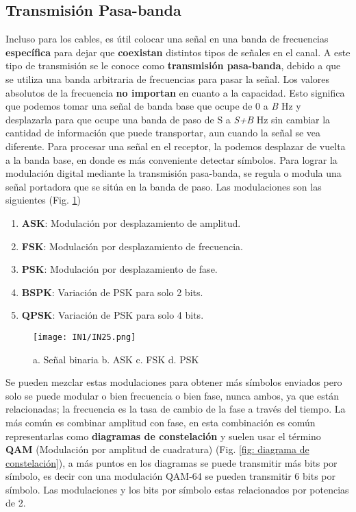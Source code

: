 \documentclass[
	12pt, %
	fleqn, %
	a4paper, %
]{LegrandOrangeBook}
\begin{document}
\subsection{Transmisión Pasa-banda}
Incluso para los cables, es útil colocar una señal en una banda de frecuencias \textbf{específica} para dejar que \textbf{coexistan} distintos tipos de señales en el canal. A este tipo de transmisión se le conoce como \textbf{transmisión pasa-banda}, debido a que se utiliza una banda arbitraria de frecuencias para pasar la señal. Los valores absolutos de la frecuencia \textbf{no importan} en cuanto a la capacidad. Esto significa que podemos tomar una señal de banda base que ocupe de 0 a \textit{B} Hz y desplazarla para que ocupe una banda de paso de S a \textit{S+B} Hz sin cambiar la cantidad de información que puede transportar, aun cuando la señal se vea diferente. Para procesar una señal en el receptor, la podemos desplazar de vuelta a la banda base, en donde es más conveniente detectar símbolos. Para lograr la modulación digital mediante la transmisión pasa-banda, se regula o modula una señal portadora que se sitúa en la banda de paso.	Las modulaciones son las siguientes (Fig. \ref{fig: modulacion ancho B})
\begin{enumerate}
\item \textbf{ASK}: Modulación por desplazamiento de amplitud.
\item \textbf{FSK}: Modulación por desplazamiento de frecuencia.
\item \textbf{PSK}: Modulación por desplazamiento de fase.
\item \textbf{BSPK}: Variación de PSK para solo 2 bits.
\item \textbf{QPSK}: Variación de PSK para solo 4 bits.
\end{enumerate}
\begin{figure}[H]
\centering
\texttt{[image: IN1/IN25.png]}
\caption{a. Señal binaria b. ASK c. FSK d. PSK}
\label{fig: modulacion ancho B}
\end{figure}
Se pueden mezclar estas modulaciones para obtener más símbolos enviados pero solo se puede modular o bien frecuencia o bien fase, nunca ambos, ya que están relacionadas; la frecuencia es la tasa de cambio de la fase a través del tiempo. La más común es combinar amplitud con fase, en esta combinación es común representarlas como \textbf{diagramas de constelación} y suelen usar el término \textbf{QAM} (Modulación por amplitud de cuadratura) (Fig. \ref{fig: diagrama de constelación}), a más puntos en los diagramas se puede transmitir más bits por símbolo, es decir con una modulación QAM-64 se pueden transmitir 6 bits por símbolo. Las modulaciones y los bits por símbolo estas relacionados por potencias de 2.\\
\end{document}
